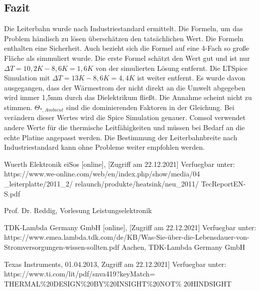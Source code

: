 \documentclass[10pt,a4paper,oneside,abstracton]{scrartcl}
\begin{document}
\begin{multicols}{2}
\section{Fazit}
Die Leiterbahn wurde nach Industriestandard ermittelt. 
Die Formeln, um das Problem händisch zu lösen überschätzen den tatsächlichen Wert. 
\newline
Die Formeln enthalten eine Sicherheit. \newline
Auch bezieht sich die Formel auf eine 4-Fach so große Fläche als simmuliert wurde. \newline
Die erste Formel schätzt den Wert gut und ist nur $\Delta T = 10,2K - 8,6K = 1,6 K$ von der simulierten Lösung entfernt. \newline
Die LTSpice Simulation mit $\Delta T = 13K - 8,6K = 4,4 K$ ist weiter entfernt.  \newline
Es wurde davon ausgegangen, dass der Wärmestrom der nicht direkt an die Umwelt abgegeben wird \newline
immer 1,5mm durch das Dielektrikum fließt. Die Annahme scheint nicht zu stimmen. \newline
$ \Theta_{*, Ambient} $ sind die dominierenden Faktoren in der Gleichung.  \newline
Bei verändern dieser Wertes wird die Spice Simulation genauer.  \newline
Comsol verwendet andere Werte für die thermische Leitfähigkeiten und müssen bei Bedarf an die echte Platine angepasst werden. \newline
Die Bestimmung der Leiterbahnbreite nach Industriestandard kann ohne Probleme weiter empfohlen werden. 
\noindent
\begin{thebibliography}{9}

Wuerth Elektronik eiSos  [online], [Zugriff am 22.12.2021] Verfuegbar unter:
 https://www.we-online.com/web/en/index.php/show/media/04
 \_leiterplatte/2011\_2/ relaunch/produkte/heatsink/neu\_2011/
 TecReport\-EN-S.pdf

Prof. Dr. Reddig, Vorlesung Leistungselektronik

TDK-Lambda Germany GmbH [online], [Zugriff am 22.12.2021] Verfuegbar unter:	https://www.emea.lambda.tdk.com/de/KB/Was-Sie-über-die-Lebensdauer-von-Stromversorgungen-wissen-sollten.pdf
Aachen, TDK-Lambda Germany GmbH



Texas Instruments, 01.04.2013, Zugriff am 22.12.2021] Verfuegbar unter: https://www.ti.com/lit/pdf/snva419?keyMatch=
THERMAL\%20DESIGN\%20BY\%20INSIGHT\%20NOT\%
20HINDSIGHT


\end{thebibliography}
\end{multicols}
\end{document}
